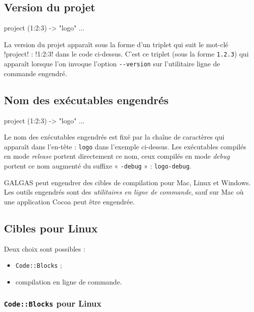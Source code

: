 \subsection{Version du projet}

\begin{galgas}
project (1:2:3) -> "logo" {
  ...
}
\end{galgas}

La version du projet apparaît sous la forme d'un triplet qui suit le mot-clé \ggs!project! : \ggs!1:2:3! dans le code ci-dessus. C'est ce triplet (sous la forme \texttt{1.2.3}) qui apparaît lorsque l'on invoque l'option \texttt{-{}-version} sur l'utilitaire ligne de commande engendré.


\subsection{Nom des exécutables engendrés}

\begin{galgas}
project (1:2:3) -> "logo" {
  ...
}
\end{galgas}

Le nom des exécutables engendrés est fixé par la chaîne de caractères qui apparaît dans l'en-tête : \texttt{logo} dans l'exemple ci-dessus. Les exécutables compilés en mode \emph{release} portent directement ce nom, ceux compilés en mode \emph{debug} portent ce nom augmenté du suffixe « \texttt{-debug} » : \texttt{logo-debug}.



GALGAS peut engendrer des cibles de compilation pour Mac, Linux et Windows. Les outils engendrés sont des \emph{utilitaires en ligne de commande}, sauf sur Mac où une application Cocoa peut être engendrée.

\subsection{Cibles pour Linux}

Deux choix sont possibles :
\begin{itemize}
\item \texttt{Code::Blocks} ;
\item compilation en ligne de commande.
\end{itemize}

\subsubsection{\texttt{Code::Blocks} pour Linux}

